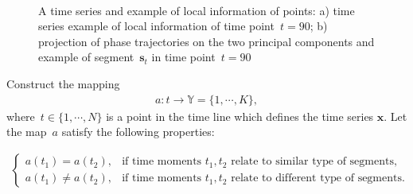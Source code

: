 \documentclass[12pt, twoside]{article}
\numberwithin{equation}{section}
\begin{document}
\begin{figure}[h!t]\center
{}
\\
\caption{A time series and example of local information of points:  a) time series example of local information of time point~$t = 90$; b) projection of phase trajectories on the two principal components and example of segment~$\textbf{s}_t$ in time point~$t = 90$}
\label{example_stat:0}
\end{figure}

Construct the mapping
\begin{equation}
\label{eq:st:4}
\begin{aligned}
a : t \to \mathbb{Y} = \{1,\cdots, K\}, 
\end{aligned}
\end{equation}
where~$t \in \{1,\cdots, N\}$ is a point in the time line which defines the time series $\textbf{x}$.
Let the map~$a$ satisfy the following properties:

\begin{equation}
\label{eq:st:5}
\begin{aligned}
\begin{cases}
    a\left(t_1\right) = a\left(t_2\right), &  \text{if time moments } t_1, t_2 \text{ relate to similar type of segments,}\\
    a\left(t_1\right) \not= a\left(t_2\right), &  \text{if time moments } t_1, t_2 \text{ relate to different type of segments.}
\end{cases}
\end{aligned}
\end{equation}
\end{document}
